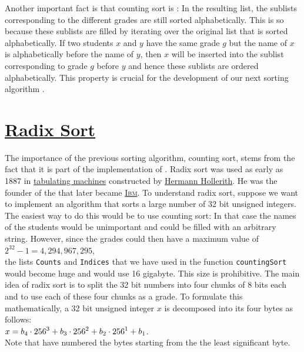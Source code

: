Another important fact is that counting sort is : In the resulting list, the sublists
corresponding to the different grades are still sorted alphabetically.  This is so because these sublists are
filled by iterating over the original list that is sorted alphabetically.  If two students $x$ and $y$ have the
same grade $g$ but the name of $x$ is alphabetically before the name of $y$, then $x$ will be inserted into the
sublist corresponding to grade $g$ before $y$ and hence these sublists are ordered alphabetically.  This property
is crucial for the development of our next sorting algorithm .

\section{\href{https://en.wikipedia.org/wiki/Radix_sort}{Radix Sort}}
The importance of the previous sorting algorithm, counting sort, stems from the fact that it is part of the
implementation of .  Radix sort was used as early as 1887 in
\href{https://en.wikipedia.org/wiki/Tabulating_machine}{tabulating machines} constructed by
\href{https://en.wikipedia.org/wiki/Herman_Hollerith}{Hermann Hollerith}.  He was the founder of
the  that later became \href{https://en.wikipedia.org/wiki/IBM}{\textsc{Ibm}}.
To understand radix sort, suppose we want to implement an algorithm that sorts a large number of 32 bit
unsigned integers.  The easiest way to do this would be to use counting sort:  In that case the names of the
students would be unimportant and could be filled with an arbitrary string.  However, since the grades could then
have a maximum value of 
\\[0.2cm]
\hspace*{1.3cm}
$2^{32} - 1 = 4,294,967,295$,
\\[0.2cm]
the lists \texttt{Counts} and \texttt{Indices} that we have used in the function \texttt{countingSort} would
become huge and would use 16 gigabyte.   This size is prohibitive.  The main idea of radix sort is to split the
32 bit numbers into four chunks of 8 bits each and to use each of these four chunks as a grade.  To formulate this
mathematically, a 32 bit unsigned integer $x$ is decomposed into its four bytes as follows:
\\[0.2cm]
\hspace*{1.3cm}
$\displaystyle x = b_4 \cdot 256^{3} + b_3 \cdot 256^{2} + b_2 \cdot 256^{1} + b_1$.
\\[0.2cm]
Note that have  numbered the bytes starting from the the least significant byte.
